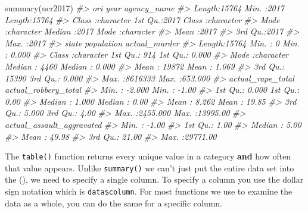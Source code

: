 \documentclass[
]{krantz}
\makeatletter
\newenvironment{Shaded}{\begin{snugshade}}{\end{snugshade}}
\newcommand{\CommentTok}[1]{\textcolor[rgb]{0.37,0.37,0.37}{\textit{#1}}}
\newcommand{\FunctionTok}[1]{\textcolor[rgb]{0,0,0}{#1}}
\newcommand{\NormalTok}[1]{#1}
\newenvironment{kframe}{%
\medskip{}
\setlength{\fboxsep}{.8em}
 \def\at@end@of@kframe{}%
 \ifinner\ifhmode%
  \def\at@end@of@kframe{\end{minipage}}%
  \begin{minipage}{\columnwidth}%
 \fi\fi%
 \def\FrameCommand##1{\hskip\@totalleftmargin \hskip-\fboxsep
 \colorbox{shadecolor}{##1}\hskip-\fboxsep
     \hskip-\linewidth \hskip-\@totalleftmargin \hskip\columnwidth}%
 \MakeFramed {\advance\hsize-\width
   \@totalleftmargin\z@ \linewidth\hsize
   \@setminipage}}%
 {\par\unskip\endMakeFramed%
 \at@end@of@kframe}
\renewenvironment{Shaded}{\begin{kframe}}{\end{kframe}}
\makeatother
\begin{document}
\begin{Shaded}
\begin{Highlighting}[]
\FunctionTok{summary}\NormalTok{(ucr2017)}
\CommentTok{\#\textgreater{}      ori                 year      agency\_name       }
\CommentTok{\#\textgreater{}  Length:15764       Min.   :2017   Length:15764      }
\CommentTok{\#\textgreater{}  Class :character   1st Qu.:2017   Class :character  }
\CommentTok{\#\textgreater{}  Mode  :character   Median :2017   Mode  :character  }
\CommentTok{\#\textgreater{}                     Mean   :2017                     }
\CommentTok{\#\textgreater{}                     3rd Qu.:2017                     }
\CommentTok{\#\textgreater{}                     Max.   :2017                     }
\CommentTok{\#\textgreater{}     state             population      actual\_murder    }
\CommentTok{\#\textgreater{}  Length:15764       Min.   :      0   Min.   :  0.000  }
\CommentTok{\#\textgreater{}  Class :character   1st Qu.:    914   1st Qu.:  0.000  }
\CommentTok{\#\textgreater{}  Mode  :character   Median :   4460   Median :  0.000  }
\CommentTok{\#\textgreater{}                     Mean   :  19872   Mean   :  1.069  }
\CommentTok{\#\textgreater{}                     3rd Qu.:  15390   3rd Qu.:  0.000  }
\CommentTok{\#\textgreater{}                     Max.   :8616333   Max.   :653.000  }
\CommentTok{\#\textgreater{}  actual\_rape\_total  actual\_robbery\_total}
\CommentTok{\#\textgreater{}  Min.   :  {-}2.000   Min.   :   {-}1.00    }
\CommentTok{\#\textgreater{}  1st Qu.:   0.000   1st Qu.:    0.00    }
\CommentTok{\#\textgreater{}  Median :   1.000   Median :    0.00    }
\CommentTok{\#\textgreater{}  Mean   :   8.262   Mean   :   19.85    }
\CommentTok{\#\textgreater{}  3rd Qu.:   5.000   3rd Qu.:    4.00    }
\CommentTok{\#\textgreater{}  Max.   :2455.000   Max.   :13995.00    }
\CommentTok{\#\textgreater{}  actual\_assault\_aggravated}
\CommentTok{\#\textgreater{}  Min.   :   {-}1.00         }
\CommentTok{\#\textgreater{}  1st Qu.:    1.00         }
\CommentTok{\#\textgreater{}  Median :    5.00         }
\CommentTok{\#\textgreater{}  Mean   :   49.98         }
\CommentTok{\#\textgreater{}  3rd Qu.:   21.00         }
\CommentTok{\#\textgreater{}  Max.   :29771.00}
\end{Highlighting}
\end{Shaded}

The \texttt{table()} function returns every unique value in a category \textbf{and} how often that value appears. Unlike \texttt{summary()} we can't just put the entire data set into the (), we need to specify a single column. To specify a column you use the dollar sign notation which is \texttt{data\$column}. For most functions we use to examine the data as a whole, you can do the same for a specific column.
\end{document}
